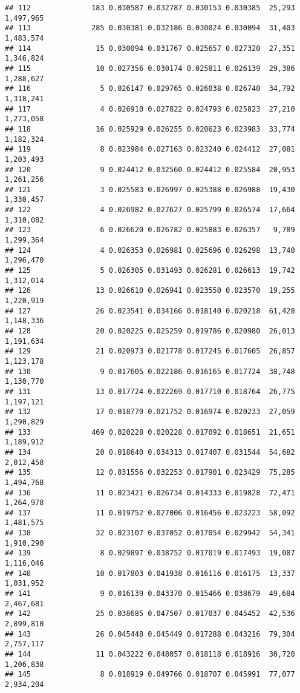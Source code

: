\documentclass[]{article}
\begin{document}
\begin{verbatim}
## 112              183 0.030587 0.032787 0.030153 0.030385  25,293 1,497,965
## 113              285 0.030381 0.032186 0.030024 0.030094  31,403 1,483,574
## 114               15 0.030094 0.031767 0.025657 0.027320  27,351 1,346,824
## 115               10 0.027356 0.030174 0.025811 0.026139  29,386 1,288,627
## 116                5 0.026147 0.029765 0.026038 0.026740  34,792 1,318,241
## 117                4 0.026910 0.027822 0.024793 0.025823  27,210 1,273,058
## 118               16 0.025929 0.026255 0.020623 0.023983  33,774 1,182,324
## 119                8 0.023984 0.027163 0.023240 0.024412  27,081 1,203,493
## 120                9 0.024412 0.032560 0.024412 0.025584  20,953 1,261,256
## 121                3 0.025583 0.026997 0.025388 0.026988  19,430 1,330,457
## 122                4 0.026982 0.027627 0.025799 0.026574  17,664 1,310,082
## 123                6 0.026620 0.026782 0.025883 0.026357   9,789 1,299,364
## 124                4 0.026353 0.026981 0.025696 0.026298  13,740 1,296,470
## 125                5 0.026305 0.031493 0.026281 0.026613  19,742 1,312,014
## 126               13 0.026610 0.026941 0.023550 0.023570  19,255 1,220,919
## 127               26 0.023541 0.034166 0.018140 0.020218  61,428 1,148,336
## 128               20 0.020225 0.025259 0.019786 0.020980  26,013 1,191,634
## 129               21 0.020973 0.021778 0.017245 0.017605  26,857 1,123,178
## 130                9 0.017605 0.022186 0.016165 0.017724  38,748 1,130,770
## 131               13 0.017724 0.022269 0.017710 0.018764  26,775 1,197,121
## 132               17 0.018770 0.021752 0.016974 0.020233  27,059 1,290,829
## 133              469 0.020228 0.020228 0.017092 0.018651  21,651 1,189,912
## 134               20 0.018640 0.034313 0.017407 0.031544  54,682 2,012,458
## 135               12 0.031556 0.032253 0.017901 0.023429  75,285 1,494,768
## 136               11 0.023421 0.026734 0.014333 0.019828  72,471 1,264,978
## 137               11 0.019752 0.027006 0.016456 0.023223  58,092 1,481,575
## 138               32 0.023107 0.037052 0.017054 0.029942  54,341 1,910,290
## 139                8 0.029897 0.038752 0.017019 0.017493  19,087 1,116,046
## 140               10 0.017803 0.041938 0.016116 0.016175  13,337 1,031,952
## 141                9 0.016139 0.043370 0.015466 0.038679  49,684 2,467,681
## 142               25 0.038685 0.047507 0.017037 0.045452  42,536 2,899,810
## 143               26 0.045448 0.045449 0.017288 0.043216  79,304 2,757,117
## 144               11 0.043222 0.048057 0.018118 0.018916  30,720 1,206,838
## 145                8 0.018919 0.049766 0.018707 0.045991  77,077 2,934,204

\end{verbatim}
\end{document}
